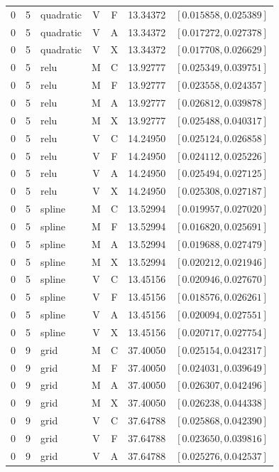 \begin{longtable}{r r l c c r l}
0 & 5 & quadratic & V & F & 13.34372 & $[0.015858,0.025389]$ \\
0 & 5 & quadratic & V & A & 13.34372 & $[0.017272,0.027378]$ \\
0 & 5 & quadratic & V & X & 13.34372 & $[0.017708,0.026629]$ \\
0 & 5 & relu & M & C & 13.92777 & $[0.025349,0.039751]$ \\
0 & 5 & relu & M & F & 13.92777 & $[0.023558,0.024357]$ \\
0 & 5 & relu & M & A & 13.92777 & $[0.026812,0.039878]$ \\
0 & 5 & relu & M & X & 13.92777 & $[0.025488,0.040317]$ \\
0 & 5 & relu & V & C & 14.24950 & $[0.025124,0.026858]$ \\
0 & 5 & relu & V & F & 14.24950 & $[0.024112,0.025226]$ \\
0 & 5 & relu & V & A & 14.24950 & $[0.025494,0.027125]$ \\
0 & 5 & relu & V & X & 14.24950 & $[0.025308,0.027187]$ \\
0 & 5 & spline & M & C & 13.52994 & $[0.019957,0.027020]$ \\
0 & 5 & spline & M & F & 13.52994 & $[0.016820,0.025691]$ \\
0 & 5 & spline & M & A & 13.52994 & $[0.019688,0.027479]$ \\
0 & 5 & spline & M & X & 13.52994 & $[0.020212,0.021946]$ \\
0 & 5 & spline & V & C & 13.45156 & $[0.020946,0.027670]$ \\
0 & 5 & spline & V & F & 13.45156 & $[0.018576,0.026261]$ \\
0 & 5 & spline & V & A & 13.45156 & $[0.020094,0.027551]$ \\
0 & 5 & spline & V & X & 13.45156 & $[0.020717,0.027754]$ \\
0 & 9 & grid & M & C & 37.40050 & $[0.025154,0.042317]$ \\
0 & 9 & grid & M & F & 37.40050 & $[0.024031,0.039649]$ \\
0 & 9 & grid & M & A & 37.40050 & $[0.026307,0.042496]$ \\
0 & 9 & grid & M & X & 37.40050 & $[0.026238,0.044338]$ \\
0 & 9 & grid & V & C & 37.64788 & $[0.025868,0.042390]$ \\
0 & 9 & grid & V & F & 37.64788 & $[0.023650,0.039816]$ \\
0 & 9 & grid & V & A & 37.64788 & $[0.025276,0.042537]$ \\

\end{longtable}
